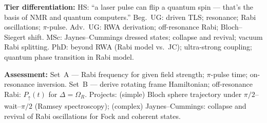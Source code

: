 \documentclass[11pt,a4paper]{article}
\begin{document}
\begin{tcolorbox}[modulebox, title={Module~I.4 / L04: Rabi Model and Two-Level Systems}]
\medskip\textbf{Tier differentiation:}
HS: ``a laser pulse can flip a quantum spin --- that's the basis of NMR and quantum computers.''
Beg.\ UG: driven TLS; resonance; Rabi oscillations; $\pi$-pulse.
Adv.\ UG: RWA derivation; off-resonance Rabi; Bloch--Siegert shift.
MSc: Jaynes--Cummings dressed states; collapse and revival; vacuum Rabi splitting.
PhD: beyond RWA (Rabi model vs.\ JC); ultra-strong coupling; quantum phase transition in Rabi model.

\medskip\textbf{Assessment:}
Set~A --- Rabi frequency for given field strength; $\pi$-pulse time; on-resonance inversion.
Set~B --- derive rotating frame Hamiltonian; off-resonance Rabi: $P_{\uparrow}(t)$ for $\Delta=\Omega_R$.
Projects: (simple) Bloch sphere trajectory under $\pi/2$--wait--$\pi/2$ (Ramsey spectroscopy);
(complex) Jaynes--Cummings: collapse and revival of Rabi oscillations for Fock and coherent states.
\end{tcolorbox}

\medskip
\end{document}
